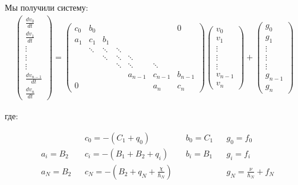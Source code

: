 Мы получили систему:
\begin{align*}
  \begin{pmatrix}
    \frac{d v_0}{dt} \\
    \frac{d v_1}{dt} \\
    \vdots \\
    \vdots \\
    \vdots \\
    \frac{d v_{n-1}}{dt} \\
    \frac{d v_{n}}{dt} 
  \end{pmatrix} 
  =
  \begin{pmatrix}
    c_0 & b_0 & &  &  &  & 0 \\
    a_1 & c_1 & b_1 &  & & & \\
     &   \ddots & \ddots & \ddots & & & \\
     & &  \ddots & \ddots & \ddots & &  \\
     & & & \ddots & \ddots & \ddots &  \\
     &  &  & & a_{n-1} & c_{n-1} & b_{n-1} \\
     0 & & & &  &a_n & c_n
  \end{pmatrix}
  \begin{pmatrix}
    v_0 \\
    v_1 \\
    \vdots \\
    \vdots \\
    \vdots \\
    v_{n-1} \\
    v_n
  \end{pmatrix} +
  \begin{pmatrix}
    g_0 \\
    g_1 \\
    \vdots \\
    \vdots \\
    \vdots \\
    g_{n-1} \\
    g_n
  \end{pmatrix}
\end{align*}

где:

\begin{align*}
  & & &c_0=-(C_1 + q_0) & &b_0=C_1 & &g_0= f_0 \\
  &a_i=B_2 & &c_i=-(B_1 + B_2 + q_i) & &b_i=B_1 & &g_i=f_i \\
  &a_N=B_2 & &c_N=-(B_2 + q_N + \frac{\chi}{\hbar_N}) & & & &g_N= \frac{\nu}{\hbar_N} + f_N
\end{align*}

